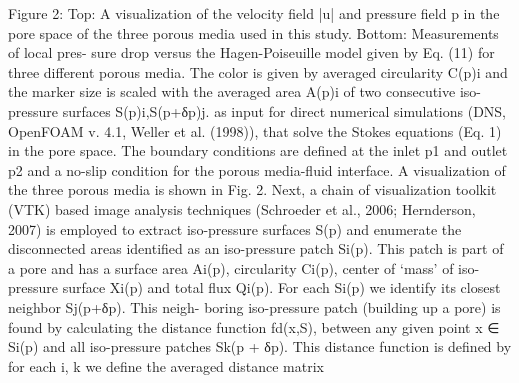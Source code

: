 Figure 2: Top: A visualization of the velocity field |u| and pressure field p in the pore space of the three porous media used in this study. Bottom: Measurements of local pres- sure drop versus the Hagen-Poiseuille model given by Eq. (11) for three different porous media. The color is given by averaged circularity C(p)i and the marker size is scaled with the averaged area A(p)i of two consecutive iso-pressure surfaces S(p)i,S(p+δp)j.
as input for direct numerical simulations (DNS, OpenFOAM v. 4.1, Weller et al. (1998)), that solve the Stokes equations (Eq. 1) in the pore space. The boundary conditions are defined at the inlet p1 and outlet p2 and a no-slip condition for the porous media-fluid interface. A visualization of the three porous media is shown in Fig. 2. Next, a chain of visualization toolkit (VTK) based image analysis techniques (Schroeder et al., 2006; Hernderson, 2007) is employed to extract iso-pressure surfaces S(p) and enumerate the disconnected areas identified as an iso-pressure patch Si(p). This patch is part of a pore
and has a surface area Ai(p), circularity Ci(p), center of ‘mass’ of iso-pressure surface Xi(p) and total flux Qi(p). For each Si(p) we identify its closest neighbor Sj(p+δp). This neigh- boring iso-pressure patch (building up a pore) is found by calculating the distance function fd(x,S), between any given point x ∈ Si(p) and all iso-pressure patches Sk(p +
δp). This distance function is defined by
for each i, k we define the averaged distance matrix

